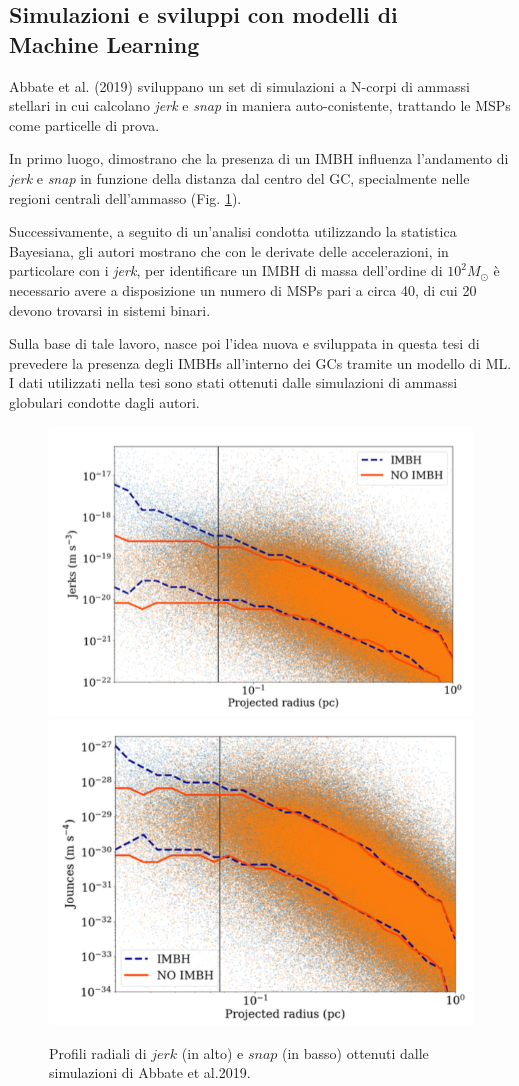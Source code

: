 \subsection{Simulazioni e sviluppi con modelli di\\ Machine Learning}
\label{subsec:sim_ml}

Abbate et al. (2019) \cite{abbate1:paper} sviluppano un set di simulazioni a N-corpi di ammassi stellari in cui calcolano \textit{jerk} e \textit{snap} in maniera auto-conistente, trattando le MSPs come particelle di prova.

In primo luogo, dimostrano che la presenza di un IMBH influenza l'andamento di \textit{jerk} e \textit{snap} in funzione della distanza dal centro del GC, specialmente nelle regioni centrali dell'ammasso (Fig. \ref{fig:profili}).

Successivamente, a seguito di un'analisi condotta utilizzando la statistica Bayesiana, gli autori mostrano che con le derivate delle accelerazioni, in particolare con i \textit{jerk}, per identificare un IMBH di massa dell'ordine di $10^{2}M_{\odot}$ è necessario avere a disposizione un numero di MSPs pari a circa 40, di cui 20 devono trovarsi in sistemi binari. 

Sulla base di tale lavoro, nasce poi l'idea nuova e sviluppata in questa tesi di prevedere la presenza degli IMBHs all'interno dei GCs tramite un modello di ML. I dati utilizzati nella tesi sono stati ottenuti dalle simulazioni di ammassi globulari condotte dagli autori.    
\begin{figure}
\begin{center}
\includegraphics[width=0.6\columnwidth]{images/jerk_rad.png}
\includegraphics[width=0.6\columnwidth]{images/snap_rad.png}
\end{center}
\caption{Profili radiali di $jerk$ (in alto) e $snap$ (in basso) ottenuti dalle simulazioni di Abbate et al.2019.}
\label{fig:profili}
\end{figure}
